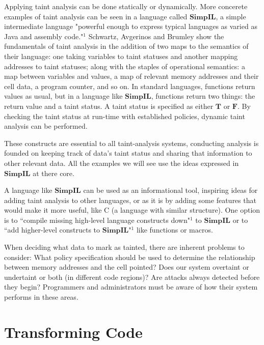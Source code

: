 \documentclass[11pt]{article}
\begin{document}
Applying taint analysis can be done statically or dynamically. 
More concerete examples of taint analysis can be seen in a language called
$\textbf{SimpIL}$, a simple intermediate language "powerful enough to express 
typical languages as varied as Java and assembly code."$^1$ 
Schwartz, Avgerinos and Brumley show the fundamentals of taint analysis in 
the addition of two maps to the semantics of their language: 
one taking variables to taint statuses and another mapping addresses to taint statuses;
along with the staples of operational semantics: 
a map between variables and values, a map of relevant memory addresses and 
their cell data, a program counter, and 
so on. In standard languages, functions return 
values as usual, but in a language like $\textbf{SimpIL}$, functions return two things:
the return value and a taint status. A taint status is specified as either $\textbf{T}$
or $\textbf{F}$. By checking the taint status at run-time with established policies,
dynamic taint analysis can be performed. 

These constructs are essential to all taint-analysis systems, conducting analysis 
is founded on keeping track of data's taint status and sharing that information
to other relevant data. All the examples we will see 
use the ideas expressed in $\textbf{SimpIL}$ at there core.

A language like $\textbf{SimpIL}$ can be used as an informational tool, inspiring
ideas for adding taint analysis to other languages, or as it is by adding some features
that would make it more useful, like C (a language with similar structure). 
One option is to ``compile missing high-level language constructs down"$^1$ to 
$\textbf{SimpIL}$ or to ``add higher-level constructs to $\textbf{SimpIL}$"$^1$ like 
functions or macros. 

When deciding what data to mark as tainted, there are inherent problems to consider:
What policy specification should be used to determine the relationship between memory 
addresses and the cell pointed?  Does our system overtaint or undertaint or both 
(in different code regions)? Are attacks always detected before they begin?
Programmers and administrators must be aware of how their system performs in these 
areas. 


\section*{Transforming Code}
\end{document}
